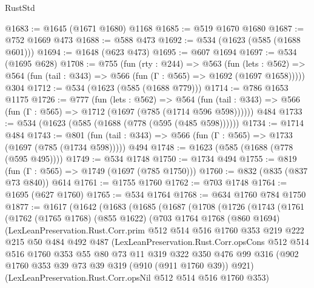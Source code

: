 \begin{lexlean}{RustStd}
\begin{coremodule}
@1683 := @1645 (@1671 @1680) @1168
@1685 := @519 @1670 @1680
@1687 := @752 @1669 @473
@1688 := @588 @473
@1692 := @534 (@1623 (@585 (@1688 @601)))
@1694 := @1648 (@623 @473)
@1695 := @607 @1694
@1697 := @534 (@1695 @628)
@1708 := @755
    (fun (rty : @244) =>
    @563
      (fun (lets : @562) =>
      @564 (fun (tail : @343) => @566 (fun (Γ : @565) => @1692 (@1697 @1658)))))
    @304
@1712 := @534 (@1623 (@585 (@1688 @779)))
@1714 := @786 @1653 @1175
@1726 := @777
    (fun (lets : @562) =>
    @564 (fun (tail : @343) => @566 (fun (Γ : @565) => @1712 (@1697 (@785 (@1714 @596 @598))))))
    @484
@1733 := @534 (@1623 (@585 (@1688 (@778 (@595 (@485 @598))))))
@1734 := @1714 @484
@1743 := @801 (fun (tail : @343) => @566 (fun (Γ : @565) => @1733 (@1697 (@785 (@1734 @598))))) @494
@1748 := @1623 (@585 (@1688 (@778 (@595 @495))))
@1749 := @534 @1748
@1750 := @1734 @494
@1755 := @819 (fun (Γ : @565) => @1749 (@1697 (@785 @1750)))
@1760 := @832 (@835 (@837 @73 @840)) @614
@1761 := @1755 @1760
@1762 := @703 @1748
@1764 := @1695 (@627 @1760)
@1765 := @534 @1764
@1768 := @634 @1760 @784 @1750
@1877 := @1617
    (@1642
      (@1683
        (@1685
          (@1687
            (@1708
              (@1726
                (@1743
                  (@1761
                    (@1762
                      (@1765 @1768)
                      (@855 @1622)
                      (@703
                        @1764
                        @1768
                        (@860 @1694)
                        (LexLeanPreservation.Rust.Corr.prim
                          @512
                          @514
                          @516
                          @1760
                          @353
                          @219
                          @222
                          @215
                          @50
                          @484
                          @492
                          @487
                          (LexLeanPreservation.Rust.Corr.opsCons
                            @512
                            @514
                            @516
                            @1760
                            @353
                            @55
                            @80
                            @73
                            @11
                            @319
                            @322
                            @350
                            @476
                            @99
                            @316
                            (@902 @1760 @353 @39 @73 @39 @319 (@910 (@911 @1760 @39)) @921)
                            (LexLeanPreservation.Rust.Corr.opsNil @512 @514 @516 @1760 @353)

\end{coremodule}
\end{lexlean}
